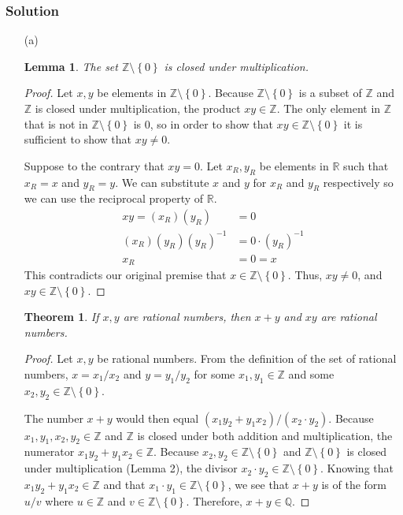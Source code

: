 \documentclass[12pt]{article}
\newtheorem*{thm}{Theorem}
\newtheorem{lem}{Lemma}
\begin{document}
\subsubsection*{Solution}
\begin{itemize}
\item[(a)]
\begin{lem}
The set $\mathbb{Z} \setminus \left\{0\right\}$ is closed under multiplication.
\end{lem}

\begin{proof}
Let $x, y$ be elements in $\mathbb{Z} \setminus \left\{0\right\}$. Because $\mathbb{Z} \setminus \left\{0\right\}$ is a subset of $\mathbb{Z}$ and $\mathbb{Z}$ is closed under multiplication, the product $xy \in \mathbb{Z}$. The only element in $\mathbb{Z}$ that is not in $\mathbb{Z} \setminus \left\{0\right\}$ is 0, so in order to show that $xy \in \mathbb{Z} \setminus \left\{0\right\}$ it is sufficient to show that $xy \neq 0$.

Suppose to the contrary that $xy = 0$. Let $x_R, y_R$ be elements in $\mathbb{R}$ such that $x_R = x$ and $y_R = y$. We can substitute $x$ and $y$ for $x_R$ and $y_R$ respectively so we can use the reciprocal property of $\mathbb{R}$.
\begin{align*}
xy = \left(x_R\right) \left(y_R\right) &= 0 \\
\left(x_R\right) \left(y_R\right) \left(y_R\right)^{-1} &= 0\cdot\left(y_R\right)^{-1} \\
x_R &= 0 = x
\end{align*}
This contradicts our original premise that $x \in \mathbb{Z} \setminus \left\{0\right\}$. Thus, $xy \neq 0$, and $xy \in \mathbb{Z} \setminus \left\{0\right\}$.
\end{proof}

\begin{thm}
If $x, y$ are rational numbers, then $x + y$ and $xy$ are rational numbers.
\end{thm}

\begin{proof}
Let $x, y$ be rational numbers. From the definition of the set of rational numbers, $x = x_1/x_2$ and $y = y_1/y_2$ for some $x_1, y_1 \in \mathbb{Z}$ and some $x_2, y_2 \in \mathbb{Z} \setminus \left\{0\right\}$.

The number $x + y$ would then equal $\left(x_1y_2 + y_1x_2\right)/\left(x_2 \cdot y_2\right)$. Because $x_1, y_1, x_2, y_2 \in \mathbb{Z}$ and $\mathbb{Z}$ is closed under both addition and multiplication, the numerator $x_1y_2 + y_1x_2 \in \mathbb{Z}$. 
Because $x_2, y_2 \in \mathbb{Z}\setminus\left\{0\right\}$ and $\mathbb{Z}\setminus\left\{0\right\}$ is closed under multiplication (Lemma 2), the divisor $x_2 \cdot y_2 \in \mathbb{Z} \setminus \left\{0\right\}$. Knowing that $x_1y_2 + y_1x_2 \in \mathbb{Z}$ and that $x_1 \cdot y_1 \in \mathbb{Z} \setminus \left\{0\right\}$, we see that $x + y$ is of the form $u / v$ where $u \in \mathbb{Z}$ and $v \in \mathbb{Z} \setminus \left\{0\right\}$. Therefore, $x + y \in \mathbb{Q}$.


\end{proof}
\end{itemize}
\end{document}
